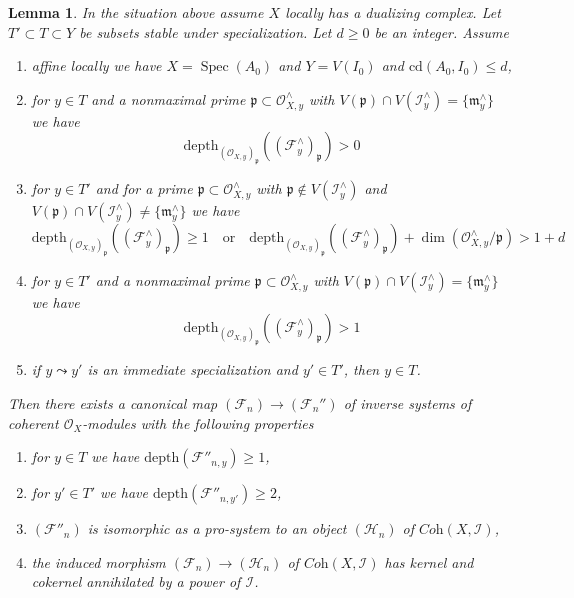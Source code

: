 \documentclass{stacks-project}
\theoremstyle{plain}
\newtheorem{lemma}[subsection]{Lemma}
\theoremstyle{definition}
\theoremstyle{remark}
\numberwithin{equation}{subsection}
\def\Spec{\mathop{\mathrm{Spec}}}
\begin{document}
\begin{lemma}
\label{lemma-improvement-formal-coherent-module-better}
In the situation above assume $X$ locally has a dualizing complex.
Let $T' \subset T \subset Y$ be subsets stable under specialization.
Let $d \geq 0$ be an integer. Assume
\begin{enumerate}
\item[(a)] affine locally we have $X = \Spec(A_0)$ and $Y = V(I_0)$
and $\text{cd}(A_0, I_0) \leq d$,
\item[(b)] for $y \in T$ and a nonmaximal prime
$\mathfrak p \subset \mathcal{O}_{X, y}^\wedge$ with
$V(\mathfrak p) \cap V(\mathcal{I}_y^\wedge) = \{\mathfrak m_y^\wedge\}$
we have
$$
\text{depth}_{(\mathcal{O}_{X, y})_\mathfrak p}
((\mathcal{F}^\wedge_y)_\mathfrak p) > 0
$$
\item[(c)] for $y \in T'$ and for a prime
$\mathfrak p \subset \mathcal{O}_{X, y}^\wedge$ with
$\mathfrak p \not \in V(\mathcal{I}_y^\wedge)$
and $V(\mathfrak p) \cap V(\mathcal{I}_y^\wedge) \not =
\{\mathfrak m_y^\wedge\}$ we have
$$
\text{depth}_{(\mathcal{O}_{X, y})_\mathfrak p}
((\mathcal{F}^\wedge_y)_\mathfrak p) \geq 1
\quad\text{or}\quad
\text{depth}_{(\mathcal{O}_{X, y})_\mathfrak p}
((\mathcal{F}^\wedge_y)_\mathfrak p) +
\dim(\mathcal{O}_{X, y}^\wedge/\mathfrak p) > 1 + d
$$
\item[(d)] for $y \in T'$ and a nonmaximal prime
$\mathfrak p \subset \mathcal{O}_{X, y}^\wedge$ with
$V(\mathfrak p) \cap V(\mathcal{I}_y^\wedge) = \{\mathfrak m_y^\wedge\}$
we have
$$
\text{depth}_{(\mathcal{O}_{X, y})_\mathfrak p}
((\mathcal{F}^\wedge_y)_\mathfrak p) > 1
$$
\item[(e)] if $y \leadsto y'$ is an immediate specialization and
$y' \in T'$, then $y \in T$.
\end{enumerate}
Then there exists a canonical map $(\mathcal{F}_n) \to (\mathcal{F}_n'')$
of inverse systems of coherent $\mathcal{O}_X$-modules
with the following properties
\begin{enumerate}
\item for $y \in T$ we have $\text{depth}(\mathcal{F}''_{n, y}) \geq 1$,
\item for $y' \in T'$ we have $\text{depth}(\mathcal{F}''_{n, y'}) \geq 2$,
\item $(\mathcal{F}''_n)$ is isomorphic as a pro-system to an object
$(\mathcal{H}_n)$ of $\textit{Coh}(X, \mathcal{I})$,
\item the induced morphism $(\mathcal{F}_n) \to (\mathcal{H}_n)$ of
$\textit{Coh}(X, \mathcal{I})$ has kernel and cokernel
annihilated by a power of $\mathcal{I}$.
\end{enumerate}
\end{lemma}
\end{document}
